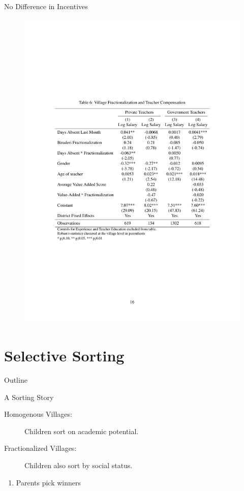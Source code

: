 \documentclass[handout]{beamer}
\begin{document}
\begin{frame}{No Difference in Incentives}
\begin{figure}[htb]
	\begin{center}
	\includegraphics[scale=0.7]{tables/frac_and_compensation.pdf}
	\end{center}
\end{figure}
\end{frame}

\section{Selective Sorting}\label{}
\begin{frame}{Outline}
	\tableofcontents[currentsection]
\end{frame}

\begin{frame}{A Sorting Story}
	\begin{description}
		\item [Homogenous Villages:] Children sort on academic potential.
		\item [Fractionalized Villages:] Children also sort by social status.
	\end{description}
	\pause
	\begin{enumerate}
		\item Parents pick winners
	\end{enumerate}
\end{frame}
\end{document}
